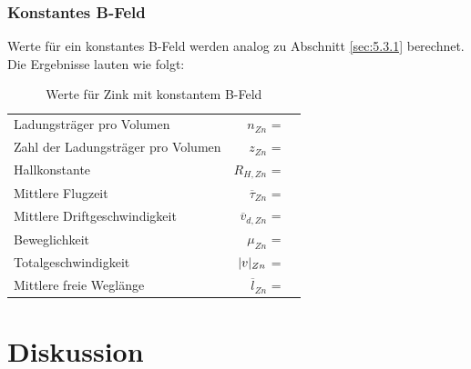 \subsubsection{Konstantes B-Feld} \label{sec:5.5.2}

\justifying Werte für ein konstantes B-Feld werden analog zu Abschnitt \ref{sec:5.3.1} berechnet. 
Die Ergebnisse lauten wie folgt:

\begin{table}[H]
\centering
    \begin{tabular}{l r l}
    \toprule
        Ladungsträger pro Volumen               &$n_{Zn}$               = & \text{}  \\
        Zahl der Ladungsträger pro Volumen      &$z_{Zn}$               = & \text{}  \\
        Hallkonstante                           &$R_{H,Zn}$             = & \text{} \\
        Mittlere Flugzeit                       &$\overline{\tau}_{Zn}$ = & \text{}\\
        Mittlere Driftgeschwindigkeit           &$\overline{v}_{d,Zn}$  = & \text{}\\
        Beweglichkeit                           &$\mu_{Zn}$             = & \text{} \\
        Totalgeschwindigkeit                    &$\lvert v\rvert_{Zn}$         = & \text{}  \\
        Mittlere freie Weglänge                 &$\overline{l}_{Zn}$    = & \text{}  \\
        \bottomrule
    \end{tabular}
\caption{Werte für Zink mit konstantem B-Feld}
\label{tab:10}
\end{table}


\section{Diskussion}



\newpage
\printbibliography

